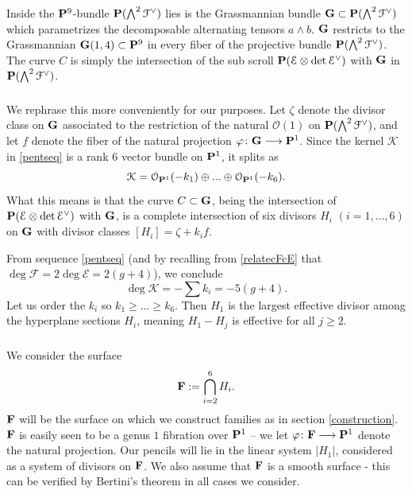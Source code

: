 \documentclass[reqno, 10 pt]{article}
\theoremstyle{definition}
\theoremstyle{remark}
\numberwithin{equation}{section}
\numberwithin{thm}{section}
\numberwithin{prop}{section}
\numberwithin{lem}{section}
\numberwithin{cor}{section}
\numberwithin{conj}{section}
\numberwithin{defn}{section}
\newcommand{\F}{{\mathbf F}}
\renewcommand{\to}{\longrightarrow}
\newcommand{\cE}{{\mathcal E}}
\newcommand{\cF}{{\mathcal F}}
\newcommand{\cK}{{\mathcal K}}
\newcommand{\cO}{{\mathcal O}}
\newcommand{\bG}{{\bf G}}
\renewcommand{\P}{{\bf P}}
\renewcommand{\F}{{\bf F}}
\newcommand {\from}{{\colon}}
\begin{document}
Inside the $\P^{9}$-bundle $\P(\bigwedge^{2}\dual{\cF})$ lies is the Grassmannian bundle $\bG \subset \P(\bigwedge^{2}\dual{\cF})$ which parametrizes the decomposable alternating tensors $a \wedge b$.  $\bG$ restricts to the Grassmannian $\bG(1,4) \subset \P^{9}$ in every fiber of the projective bundle $\P(\bigwedge^{2}\dual{\cF})$.   The curve $C$ is simply the intersection of the sub scroll $\P(\cE \otimes \det \dual{\cE})$ with $\bG$ in $\P(\bigwedge^{2}\dual{\cF})$. 

\subsubsection{}
We rephrase this more conveniently for our purposes.  Let $\zeta$ denote the divisor class on $\bG$ associated to the restriction of the natural $\cO(1)$ on $\P(\bigwedge^{2}\dual{\cF})$, and let $f$ denote the fiber of the natural projection $\varphi \from \bG \to \P^{1}$.   Since the kernel $\cK$ in \eqref{pentseq} is a rank $6$ vector bundle on $\P^{1}$, it splits as 
\begin{equation}\label{K}
\cK = \cO_{\P^{1}}(-k_{1}) \oplus ... \oplus \cO_{\P^{1}}(-k_{6}).
\end{equation}  
What this means is that the curve $C \subset \bG$, being the intersection of $\P(\cE \otimes \det \dual{\cE})$ with $\bG$, is a complete intersection of six divisors $H_{i}$  $(i = 1, ... ,  6)$ on $\bG$ with divisor classes $[H_{i}] = \zeta + k_{i}f$.  

From sequence \eqref{pentseq} (and by recalling from \autoref{relatecFcE} that $\deg \cF = 2 \deg \cE = 2(g+4)$), we conclude  \[\deg \cK = - \sum k_{i} = -5(g+4).\] Let us order the $k_{i}$ so  $k_{1} \geq ... \geq k_{6}$.   Then $H_{1}$ is the largest effective divisor among the hyperplane sections $H_{i}$, meaning $H_{1} - H_{j}$ is effective for all $j \geq 2$.  

\subsubsection{}
We consider the surface \[\F := \bigcap_{i = 2}^{6} H_{i}.\] $\F$ will be the surface on which we construct families as in section \ref{construction}.  $\F$ is easily seen to be a genus $1$ fibration over $\P^{1}$ -- we let $\varphi \from \F \to \P^{1} $ denote the natural projection.  Our pencils will lie in the linear system $|H_{1}|$, considered as a system of divisors on $\F$.  We also assume that $\F$ is a smooth surface - this can be verified by Bertini's theorem in all cases we consider.
 
\end{document}
